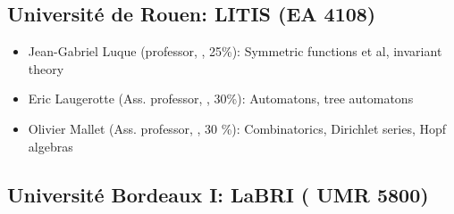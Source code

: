 \subsection*{Université de Rouen: LITIS (EA 4108)}


\begin{itemize}
\item Jean-Gabriel Luque (professor, \CS, 25\%): Symmetric functions
  et al,
  invariant theory%

\item Eric Laugerotte (Ass. professor, \CS, 30\%): %
  Automatons, tree automatons%
\item Olivier Mallet (Ass. professor, \CS, 30 \%): %
  Combinatorics, Dirichlet series, Hopf algebras
\end{itemize}

\vspace{-1.2ex}
\subsection*{Université Bordeaux I: LaBRI (%
  UMR 5800)}

